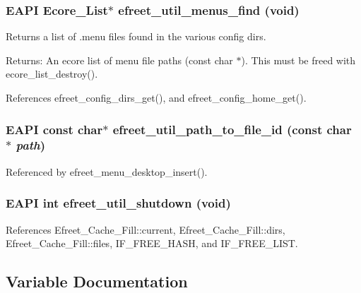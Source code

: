 \subsubsection{\setlength{\rightskip}{0pt plus 5cm}EAPI Ecore\_\-List$\ast$ efreet\_\-util\_\-menus\_\-find (void)}\label{efreet__utils_8c_adad7835d4a548070d11f093a900513d}


Returns a list of .menu files found in the various config dirs. \begin{Desc}
\item[Returns:]An ecore list of menu file paths (const char $\ast$). This must be freed with ecore\_\-list\_\-destroy(). \end{Desc}


References efreet\_\-config\_\-dirs\_\-get(), and efreet\_\-config\_\-home\_\-get().
\subsubsection{\setlength{\rightskip}{0pt plus 5cm}EAPI const char$\ast$ efreet\_\-util\_\-path\_\-to\_\-file\_\-id (const char $\ast$ {\em path})}\label{efreet__utils_8c_e499b43f751ef5d682a480b68ef07d4e}




Referenced by efreet\_\-menu\_\-desktop\_\-insert().
\subsubsection{\setlength{\rightskip}{0pt plus 5cm}EAPI int efreet\_\-util\_\-shutdown (void)}\label{efreet__utils_8c_3abde568cd48dbea047fbbe2e5d8da10}




References Efreet\_\-Cache\_\-Fill::current, Efreet\_\-Cache\_\-Fill::dirs, Efreet\_\-Cache\_\-Fill::files, IF\_\-FREE\_\-HASH, and IF\_\-FREE\_\-LIST.

\subsection{Variable Documentation}
